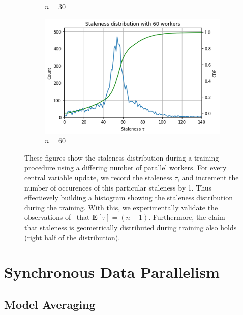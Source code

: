 \begin{figure}
\begin{subfigure}{.45\textwidth}
     \caption{$n = 30$}
     \label{fig:staleness_distribution_30}
  \end{subfigure}
  \begin{subfigure}{.45\textwidth}
     \centering
     \includegraphics[width=\linewidth]{resources/images/staleness_60}
     \caption{$n = 60$}
     \label{fig:staleness_distribution_60}
  \end{subfigure}
  \caption{These figures show the staleness distribution during a training procedure using a differing number of parallel workers. For every central variable update, we record the staleness $\tau$, and increment the number of occurences of this particular staleness by 1. Thus effectievely building a histogram showing the staleness distribution during the training. With this, we experimentally validate the observations of~\cite{implicitmomentum} that $\mathbf{E}[\tau] = (n - 1)$. Furthermore, the claim that staleness is geometrically distributed during training also holds (right half of the distribution).}
  \label{fig:staleness_distribution}
\end{figure}

\section{Synchronous Data Parallelism}
\label{sec:synchronous_data_parallelism}

\subsection{Model Averaging}
\label{sec:model_averaging}

